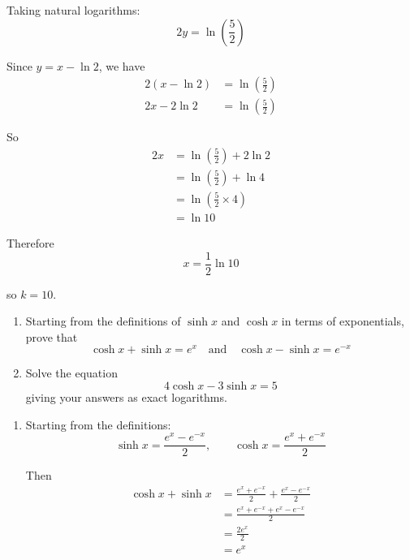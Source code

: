 \documentclass[leqno]{article}
\begin{document}
\begin{enumerate}[
  label=\textbf{\arabic*.},
  leftmargin=*,
  topsep=0pt,
  partopsep=0pt,
  parsep=0pt
]
\begin{djsSolution}
\begin{enumerate}[label=\textbf{(\alph*)}]
  Taking natural logarithms:
  \[
  2y=\ln\left(\frac{5}{2}\right)
  \]

  Since $y=x-\ln 2$, we have
  \begin{align*}
  2(x-\ln 2)&=\ln\left(\frac{5}{2}\right) \\
  2x-2\ln 2&=\ln\left(\frac{5}{2}\right)
  \end{align*}

  So
  \begin{align*}
  2x
  &=\ln\left(\frac{5}{2}\right)+2\ln 2 \\
  &=\ln\left(\frac{5}{2}\right)+\ln 4 \\
  &=\ln\left(\frac{5}{2}\times 4\right) \\
  &=\ln 10
  \end{align*}

  Therefore
  \[
  x=\frac{1}{2}\ln 10
  \]

  so \(k=10\).
\end{enumerate}
\end{djsSolution}


\newpage

\questionitem

\begin{enumerate}[label=\textbf{(\alph*)}]
  \item Starting from the definitions of $\sinh x$ and $\cosh x$ in terms of exponentials, prove that
  \[
  \cosh x + \sinh x = e^x \quad \text{and} \quad \cosh x - \sinh x = e^{-x}
  \]
  \item Solve the equation
  \[
  4\cosh x - 3\sinh x = 5
  \]
  giving your answers as exact logarithms.  \\
\end{enumerate}

\vspace*{10pt}

\begin{djsSolution}
\begin{enumerate}[label=\textbf{(\alph*)}]
  \item Starting from the definitions:
  \[
  \sinh x=\frac{e^x-e^{-x}}{2},
  \qquad
  \cosh x=\frac{e^x+e^{-x}}{2}
  \]

  Then
  \begin{align*}
  \cosh x+\sinh x
  &= \frac{e^x+e^{-x}}{2}+\frac{e^x-e^{-x}}{2}\\
  &= \frac{e^x+e^{-x}+e^x-e^{-x}}{2}\\
  &= \frac{2e^x}{2}\\
  &= e^x
  \end{align*}


\end{enumerate}
\end{djsSolution}
\end{enumerate}
\end{document}
